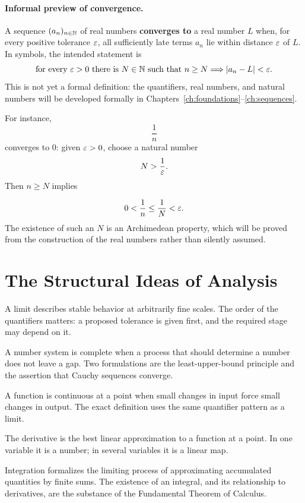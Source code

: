 \paragraph{Informal preview of convergence.}
A sequence $(a_n)_{n\in\mathbb{N}}$ of real numbers \textbf{converges to} a real number $L$ when, for every positive tolerance $\varepsilon$, all sufficiently late terms $a_n$ lie within distance $\varepsilon$ of $L$. In symbols, the intended statement is
\[
\text{for every }\varepsilon>0\text{ there is }N\in\mathbb{N}\text{ such that }n\geq N\Longrightarrow \lvert a_n-L\rvert<\varepsilon.
\]
This is not yet a formal definition: the quantifiers, real numbers, and natural numbers will be developed formally in Chapters~\ref{ch:foundations}--\ref{ch:sequences}.

For instance,
\[
\frac1n
\]
 converges to $0$: given $\varepsilon>0$, choose a natural number
\[
N>\frac1{\varepsilon}.
\]
 Then $n\geq N$ implies

\[
0<\frac1n\leq\frac1N<\varepsilon.
\]
 The existence of such an $N$ is an Archimedean property, which will be proved from the construction of the real numbers rather than silently assumed.

\section{The Structural Ideas of Analysis}

\begin{description}[style=nextline]
\item[Limits] A limit describes stable behavior at arbitrarily fine scales. The order of the quantifiers matters: a proposed tolerance is given first, and the required stage may depend on it.
\item[Completeness] A number system is complete when a process that should determine a number does not leave a gap. Two formulations are the least-upper-bound principle and the assertion that Cauchy sequences converge.
\item[Continuity] A function is continuous at a point when small changes in input force small changes in output. The exact definition uses the same quantifier pattern as a limit.
\item[Differentiation] The derivative is the best linear approximation to a function at a point. In one variable it is a number; in several variables it is a linear map.
\item[Integration] Integration formalizes the limiting process of approximating accumulated quantities by finite sums. The existence of an integral, and its relationship to derivatives, are the substance of the Fundamental Theorem of Calculus.
\end{description}

